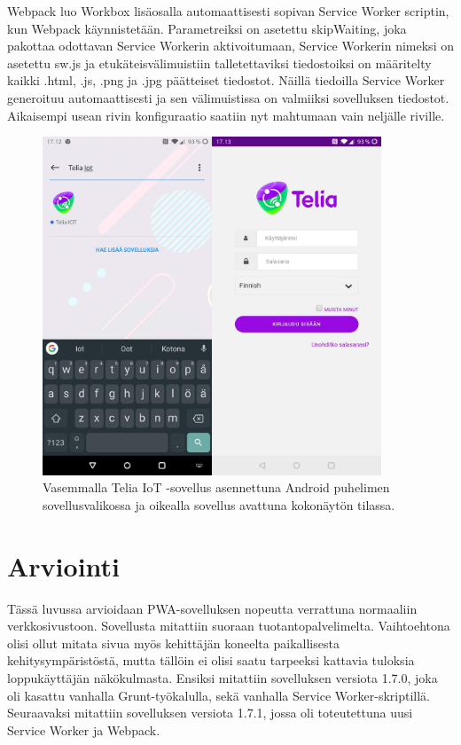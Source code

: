 \documentclass{tktltiki}
\begin{document}
Webpack luo Workbox lisäosalla automaattisesti sopivan Service Worker scriptin, kun Webpack käynnistetään. Parametreiksi on asetettu skipWaiting, joka pakottaa odottavan Service Workerin aktivoitumaan, Service Workerin nimeksi on asetettu sw.js ja etukäteisvälimuistiin talletettaviksi tiedostoiksi on määritelty kaikki .html, .js, .png ja .jpg päätteiset tiedostot. Näillä tiedoilla Service Worker generoituu automaattisesti ja sen välimuistissa on valmiiksi sovelluksen tiedostot. Aikaisempi usean rivin konfiguraatio saatiin nyt mahtumaan vain neljälle riville. 


\begin{figure}[h]
  \centering
    \includegraphics[width=0.9\textwidth]{teliaiot_puhelimessa.jpg}
      \caption{Vasemmalla Telia IoT -sovellus asennettuna Android puhelimen sovellusvalikossa ja oikealla sovellus avattuna kokonäytön tilassa.}
      \label{teliaiot_puhelimessa_asennettuna}
\end{figure}

\clearpage
\newpage
\section{Arviointi}

Tässä luvussa arvioidaan PWA-sovelluksen nopeutta verrattuna normaaliin verkkosivustoon. 
Sovellusta mitattiin suoraan tuotantopalvelimelta. Vaihtoehtona olisi ollut mitata sivua myös kehittäjän koneelta paikallisesta kehitysympäristöstä, mutta tällöin ei olisi saatu tarpeeksi kattavia tuloksia loppukäyttäjän näkökulmasta. Ensiksi mitattiin sovelluksen versiota 1.7.0, joka oli kasattu vanhalla Grunt-työkalulla, sekä vanhalla Service Worker-skriptillä. Seuraavaksi mitattiin sovelluksen versiota 1.7.1, jossa oli toteutettuna uusi Service Worker ja Webpack.
\end{document}
